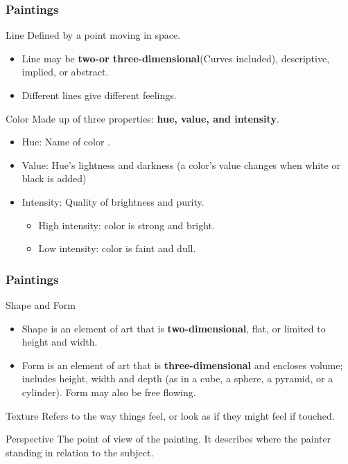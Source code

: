 \documentclass{beamer}
\begin{document}
\begin{frame}
\frametitle{Paintings}
\begin{block}{Line}
Defined by a point moving in space. 
\begin{itemize}
\item Line may be \textbf{two-or three-dimensional}(Curves included), descriptive, implied, or abstract. 
\item Different lines give different feelings.
\end{itemize}

\end{block}

\begin{block}{Color}
Made up of three properties: \textbf{hue, value, and intensity}.
\begin{itemize}
\item Hue: Name of color .
\item Value: Hue's lightness and darkness (a color’s value changes when white or black is added) 
\item Intensity: Quality of brightness and purity.
	\begin{itemize}
	\item High intensity: color is strong and bright.
	\item Low intensity: color is faint and dull.
	\end{itemize}
\end{itemize}
\end{block}
\end{frame}
\begin{frame}
\frametitle{Paintings}
\begin{block}{Shape and Form}
\begin{itemize}
\item Shape is an element of art that is \textbf{two-dimensional}, flat, or limited to height and width.
\item Form is an element of art that is \textbf{three-dimensional} and encloses volume; includes height, width and depth (as in a cube, a sphere, a pyramid, or a cylinder). Form may also be free flowing. 
\end{itemize}
\end{block}

\begin{block}{Texture}
Refers to the way things feel, or look as if they might feel if touched.
\end{block}

\begin{block}{Perspective}
The point of view of the painting. It describes where the painter standing in relation to the subject.
\end{block}
\end{frame}
\end{document}
